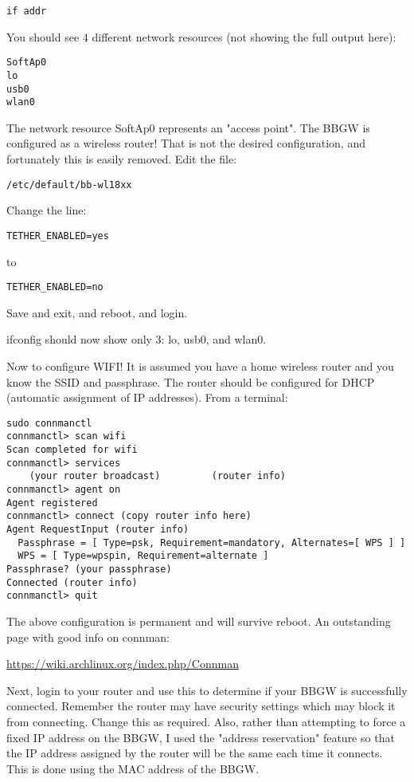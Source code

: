 \begin{verbatim}
if addr
\end{verbatim}

You should see 4 different network resources (not showing the full output here):

\begin{verbatim}
SoftAp0
lo
usb0
wlan0
\end{verbatim}

The network resource SoftAp0 represents an "access point".
The BBGW is configured as a wireless router!
That is not the desired configuration, and fortunately this is easily removed.
Edit the file:

\begin{verbatim}
/etc/default/bb-wl18xx
\end{verbatim}

Change the line:

\begin{verbatim}
TETHER_ENABLED=yes
\end{verbatim}

to

\begin{verbatim}
TETHER_ENABLED=no
\end{verbatim}

Save and exit, and reboot, and login.

ifconfig should now show only 3:  lo, usb0, and wlan0.

Now to configure WIFI!  It is assumed you have a home wireless router and you 
know the SSID and passphrase.
The router should be configured for DHCP (automatic assignment of IP addresses).
From a terminal:

\begin{verbatim}
sudo connmanctl
connmanctl> scan wifi
Scan completed for wifi
connmanctl> services
    (your router broadcast)         (router info)
connmanctl> agent on
Agent registered
connmanctl> connect (copy router info here)
Agent RequestInput (router info)
  Passphrase = [ Type=psk, Requirement=mandatory, Alternates=[ WPS ] ]
  WPS = [ Type=wpspin, Requirement=alternate ]
Passphrase? (your passphrase)
Connected (router info)
connmanctl> quit
\end{verbatim}

The above configuration is permanent and will survive reboot.
An outstanding page with good info on connman:

\url{https://wiki.archlinux.org/index.php/Connman}

Next, login to your router and use this to determine if 
your BBGW is successfully connected.
Remember the router may have security settings which may block it from 
connecting.  Change this as required.
Also, rather than attempting to force a fixed IP address on the BBGW, I used 
the "address reservation" feature
so that the IP address assigned by the router will be the same each time it 
connects.  This is done using the MAC address of the BBGW.

